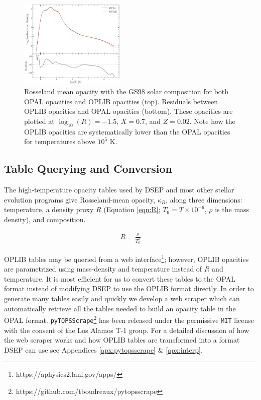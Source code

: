 \begin{figure}
	\centering
	\includegraphics[width=0.45\textwidth]{OpacityComparision.pdf}
	\caption{Rosseland mean opacity with the GS98 solar composition for both
	OPAL opacities and OPLIB opacities (top). Residuals between OPLIB opacities
	and OPAL opacities (bottom). These opacities are plotted at $\log _{10}(R)
	= -1.5$, $X=0.7$, and $Z=0.02$. Note how the OPLIB opacities are
	systematically lower than the OPAL opacities for temperatures above $10^5$
	K.}
	\label{fig:opacComp}
\end{figure}

\subsection{Table Querying and Conversion}
The high-temperature opacity tables used by DSEP and most other stellar
evolution programs give Rosseland-mean opacity, $\kappa_{R}$, along three
dimensions: temperature, a density proxy $R$ (Equation \ref{eqn:R}; $T_{6} =
T\times10^{-6}$, $\rho$ is the mass density), and composition. 

\begin{align} \label{eqn:R}
	R = \frac{\rho}{T_{6}^{3}}
\end{align}

OPLIB tables may be queried from a web
interface\footnote{https://aphysics2.lanl.gov/apps/}; however, OPLIB opacities
are parametrized using mass-density and temperature instead of $R$ and
temperature. It is most efficient for us to convert these tables to the OPAL
format instead of modifying DSEP to use the OPLIB format directly. In order to
generate many tables easily and quickly we develop a web scraper
\citep[\texttt{pyTOPSScrape},][]{Boudreaux22} which can automatically retrieve
all the tables needed to build an opacity table in the OPAL format.
\texttt{pyTOPSScrape}\footnote{https://github.com/tboudreaux/pytopsscrape} has
been released under the permissive \texttt{MIT} license with the consent of the
Los Alamos T-1 group. For a detailed discussion of how the web scraper works
and how OPLIB tables are transformed into a format DSEP can use see Appendices
\ref{apx:pytopsscrape} \& \ref{apx:interp}.

